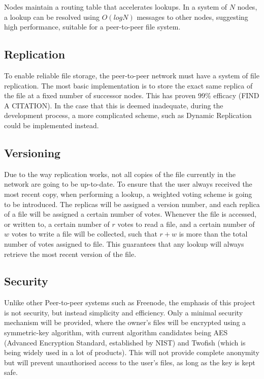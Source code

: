 \documentclass[8pt,a4paper]{article}
\begin{document}
Nodes maintain a routing table that accelerates lookups. In a system of $N$ nodes, a lookup can be resolved using $O(log N)$ messages to other nodes, suggesting high performance, suitable for a peer-to-peer file system.

\subsection{Replication}
To enable reliable file storage, the peer-to-peer network must have a system of file replication. The most basic implementation is to store the exact same replica of the file at a fixed number of successor nodes. This has proven 99\% efficacy (FIND A CITATION).
In the case that this is deemed inadequate, during the development process, a more complicated scheme, such as Dynamic Replication could be implemented instead.

\subsection{Versioning}
Due to the way replication works, not all copies of the file currently in the network are going to be up-to-date. To ensure that the user always received the most recent copy, when performing a lookup, a weighted voting scheme is going to be introduced. The replicas will be assigned a version number, and each replica of a file will be assigned a certain number of votes. Whenever the file is accessed, or written to, a certain number of $r$ votes to read a file, and a certain number of $w$ votes to write a file will be collected, such that $r + w$ is more than the total number of votes assigned to file. This guarantees that any lookup will always retrieve the most recent version of the file.


\subsection{Security}

Unlike other Peer-to-peer systems such as Freenode, the emphasis of this project is not security, but instead simplicity and efficiency. Only a minimal security mechanism will be provided, where the owner's files will be encrypted using a symmetric-key algorithm, with current algorithm candidates being AES (Advanced Encryption Standard, established by NIST) and Twofish (which is being widely used in a lot of products).
This will not provide complete anonymity but will prevent unauthorised access to the user's files, as long as the key is kept safe.
\end{document}
